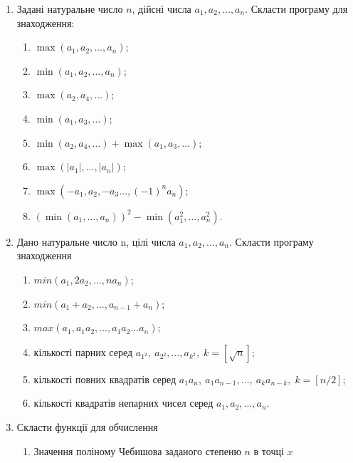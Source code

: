 \documentclass[]{article}
\makeatletter
\newcommand{\xslalph}[1]{\expandafter\@xslalph\csname c@#1\endcsname}
\newcommand{\@xslalph}[1]{%
    \ifcase#1\or а\or б\or в\or г\or д\or e\or є\or ж\or з\or i%
    \or й\or к\or л\or м\or н\or о\or п\or р\or с\or т%
    \or у\or ф\or х\or ц\or ч\or ш\or ю\or я\or аа\or бб\or вв %
    \else\@ctrerr\fi%
}
\makeatother
\begin{document}
\begin{enumerate}
\item Задані натуральне число \(n\), дійсні числа
\(a_{1},a_{2},\ldots,a_{n}\). Скласти програму для знаходження:
\begin{enumerate}[label=\xslalph*)]
\item
 \(\max\left( a_{1},a_{2},\ldots,a_{n} \right)\); 
\item
\(\min\left( a_{1},a_{2},\ldots,a_{n} \right)\);
\item \(\max\left( a_{2},a_{4},\ldots \right)\); 
\item
\(\min\left( a_{1},a_{3},\ldots \right)\);
\item
\(\min\left( a_{2},a_{4},\ldots \right) + \max\left( a_{1},a_{3},\ldots \right)\);
\item
\(\max\left( \left| a_{1} \right|,\ldots,\left| a_{n} \right| \right)\);
\item \(\max\left( -a_{1},a_{2}, -a_{3}\ldots,(-1)^{n}a_{n} \right)\);
\item
\(\left( \min\left( a_{1},\ldots,a_{n} \right) \right)^{2} - \min\left( a_{1}^{2},\ldots,a_{n}^{2} \right)\).

\end{enumerate}

\item Дано натуральне число n, цілі числа \(a_{1},a_{2},\ldots,a_{n}\).
Скласти програму знаходження
\begin{enumerate}[label=\xslalph*)]
\item
 \(min(a_{1},2a_{2},\ldots,na_{n})\);

\item \(min(a_{1} + a_{2},\ldots,a_{n - 1} + a_{n})\);

\item \(max(a_{1},a_{1}a_{2},\ldots,a_{1}a_{2}\ldots a_{n})\);
\item кількості парних серед \(a_{1^2},\ a_{2^2},\ldots,a_{k^2},\; k=[\sqrt{n}] \);
\item кількості повних квадратів серед \(a_{1}a_{n},\ a_{1}a_{n-1},\ldots,\ a_{k}a_{n-k},\; k=[n/2]\);
\item кількості квадратів непарних чисел серед
\(a_{1},a_{2},\ldots,a_{n}\).
\end{enumerate}

\item
Скласти функції для обчислення
\begin{enumerate}[label=\xslalph*)]
\item
Значення поліному Чебишова заданого степеню \(n\) в точці \(x\)


\end{enumerate}
\end{enumerate}
\end{document}
